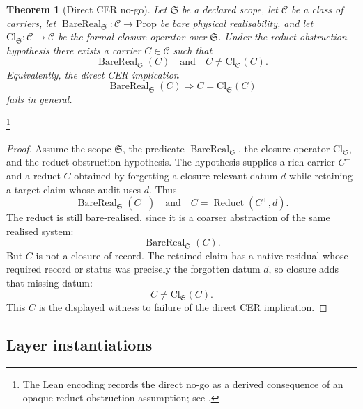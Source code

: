 \documentclass[11pt]{article}
\newtheorem{theorem}{Theorem}[section]
\theoremstyle{definition}
\begin{document}
\begin{theorem}[Direct CER no-go]\label{thm:CER-direct-no-go}
Let \(\mathfrak S\) be a declared scope, let \(\mathcal C\) be a
class of carriers, let
\(\operatorname{BareReal}_{\mathfrak S}:\mathcal C\to\mathrm{Prop}\)
be bare physical realisability, and let
\(\mathrm{Cl}_{\mathfrak S}:\mathcal C\to\mathcal C\) be the formal
closure operator over \(\mathfrak S\).  Under the reduct-obstruction
hypothesis there exists a carrier \(C\in\mathcal C\) such that
\[
  \operatorname{BareReal}_{\mathfrak S}(C)
  \quad\text{and}\quad
  C\ne \mathrm{Cl}_{\mathfrak S}(C).
\]
Equivalently, the direct CER implication
\[
  \operatorname{BareReal}_{\mathfrak S}(C)
  \Longrightarrow
  C=\mathrm{Cl}_{\mathfrak S}(C)
\]
fails in general.
\end{theorem}
\footnote{The Lean encoding records the direct no-go as a derived
consequence of an opaque reduct-obstruction assumption; see
.}
\begin{proof}
Assume the scope \(\mathfrak S\), the predicate
\(\operatorname{BareReal}_{\mathfrak S}\), the closure operator
\(\mathrm{Cl}_{\mathfrak S}\), and the reduct-obstruction
hypothesis.  The hypothesis supplies a rich carrier \(C^+\) and a
reduct \(C\) obtained by forgetting a closure-relevant datum \(d\)
while retaining a target claim whose audit uses \(d\).  Thus
\[
  \operatorname{BareReal}_{\mathfrak S}(C^+)
  \quad\text{and}\quad
  C=\operatorname{Reduct}(C^+,d).
\]
The reduct is still bare-realised, since it is a coarser abstraction
of the same realised system:
\[
  \operatorname{BareReal}_{\mathfrak S}(C).
\]
But \(C\) is not a closure-of-record.  The retained claim has a
native residual whose required record or status was precisely the
forgotten datum \(d\), so closure adds that missing datum:
\[
  C\ne \mathrm{Cl}_{\mathfrak S}(C).
\]
This \(C\) is the displayed witness to failure of the direct CER
implication.
\end{proof}

\subsection*{Layer instantiations}\label{layer-inst:CER-direct}
\end{document}

